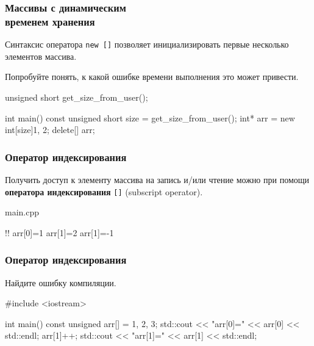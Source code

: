 \documentclass[compress, 8pt, aspectratio=169]{beamer}
\begin{document}
\begin{frame}[fragile]

    \frametitle{Массивы с динамическим \\ временем хранения}

    Синтаксис оператора \verb|new []| позволяет инициализировать
    первые несколько элементов массива.

    \begin{task}
        Попробуйте понять, к какой ошибке времени выполнения
        это может привести.
    \end{task}

    \begin{myinplacelisting}[minted language=cpp]
unsigned short get_size_from_user();

int main() {
    const unsigned short size = get_size_from_user();
    int* arr = new int[size]{1, 2};
    delete[] arr;
}
    \end{myinplacelisting}

\end{frame}

\begin{frame}[fragile]

    \frametitle{Оператор индексирования}

    \hfill \break
    Получить доступ к элементу массива на запись и/или чтение
    можно при помощи \textbf{оператора индексирования}\footnotemark{} \verb|[]|
    (subscript operator).


        {main.cpp}

    \begin{terminalwindow}
!!
arr[0]=1
arr[1]=2
arr[1]=-1
    \end{terminalwindow}

\end{frame}

\begin{frame}[fragile]

    \frametitle{Оператор индексирования}

    \begin{task}
        Найдите ошибку компиляции.
    \end{task}

    \begin{myinplacelisting}[minted language=cpp]
#include <iostream>

int main() {
    const unsigned arr[] = {1, 2, 3};
    std::cout << "arr[0]=" << arr[0] << std::endl;
    arr[1]++;
    std::cout << "arr[1]=" << arr[1] << std::endl;
}
    \end{myinplacelisting}

\end{frame}
\end{document}
